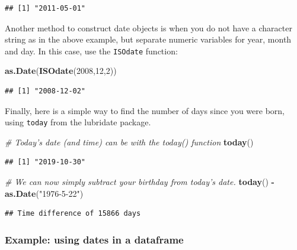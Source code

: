 \documentclass[]{book}
\newenvironment{Shaded}{\begin{snugshade}}{\end{snugshade}}
\newcommand{\CommentTok}[1]{\textcolor[rgb]{0.56,0.35,0.01}{\textit{#1}}}
\newcommand{\DecValTok}[1]{\textcolor[rgb]{0.00,0.00,0.81}{#1}}
\newcommand{\KeywordTok}[1]{\textcolor[rgb]{0.13,0.29,0.53}{\textbf{#1}}}
\newcommand{\NormalTok}[1]{#1}
\newcommand{\OperatorTok}[1]{\textcolor[rgb]{0.81,0.36,0.00}{\textbf{#1}}}
\newcommand{\StringTok}[1]{\textcolor[rgb]{0.31,0.60,0.02}{#1}}
\begin{document}
\begin{verbatim}
## [1] "2011-05-01"
\end{verbatim}

Another method to construct date objects is when you do not have a character string as in the above example, but separate numeric variables for year, month and day. In this case, use the \texttt{ISOdate} function:

\begin{Shaded}
\begin{Highlighting}[]
\KeywordTok{as.Date}\NormalTok{(}\KeywordTok{ISOdate}\NormalTok{(}\DecValTok{2008}\NormalTok{,}\DecValTok{12}\NormalTok{,}\DecValTok{2}\NormalTok{))}
\end{Highlighting}
\end{Shaded}

\begin{verbatim}
## [1] "2008-12-02"
\end{verbatim}

Finally, here is a simple way to find the number of days since you were born, using \texttt{today} from the lubridate package.

\begin{Shaded}
\begin{Highlighting}[]
\CommentTok{# Today's date (and time) can be with the today() function}
\KeywordTok{today}\NormalTok{()}
\end{Highlighting}
\end{Shaded}

\begin{verbatim}
## [1] "2019-10-30"
\end{verbatim}

\begin{Shaded}
\begin{Highlighting}[]
\CommentTok{# We can now simply subtract your birthday from today's date.}
\KeywordTok{today}\NormalTok{() }\OperatorTok{-}\StringTok{ }\KeywordTok{as.Date}\NormalTok{(}\StringTok{"1976-5-22"}\NormalTok{)}
\end{Highlighting}
\end{Shaded}

\begin{verbatim}
## Time difference of 15866 days
\end{verbatim}

\hypertarget{datesdataframe}{%
\subsubsection{Example: using dates in a dataframe}\label{datesdataframe}}
\end{document}
